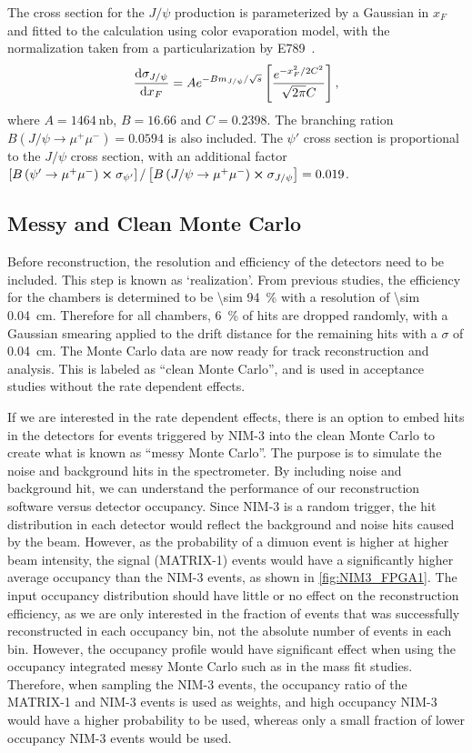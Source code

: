 \documentclass[../main.tex]{subfiles}
\begin{document}
The cross section for the $J/\psi$ production is parameterized by a Gaussian in $x_F$ and fitted to the
calculation using color evaporation model, with the normalization taken from a particularization by E789~\cite{schub1995}.
\begin{equation}
	\dv{\sigma_{J/\psi}}{x_F} = Ae^{-Bm_{J/\psi}/\sqrt{s}} \left[ \frac{e^{-x^2_F/2C^2}}{\sqrt{2\pi}C} \right],
\end{equation}
where $A=\SI{1464}{\nano\barn}$, $B=16.66$ and $C=0.2398$.
The branching ration $B\left(J/\psi\rightarrow \mu^+ \mu^-\right)=0.0594$ is also included.
The $\psi'$ cross section is proportional to the $J/\psi$ cross section, with an additional factor
$\left[B\left(\psi'\rightarrow \mu^+ \mu^-\right)\cross\sigma_{\psi'}\right]/\left[B\left(J/\psi\rightarrow \mu^+ \mu^-\right)\cross\sigma_{J/\psi}\right]=0.019$.

\subsection{Messy and Clean Monte Carlo}
\label{subsec:messyMC}
Before reconstruction, the resolution and efficiency of the detectors need to be included.
This step is known as `realization'.
From previous studies, the efficiency for the chambers is determined to be \SI{\sim 94}{\percent}
with a resolution of \SI{\sim 0.04}{\cm}. Therefore for all chambers, \SI{6}{\percent} of
hits are dropped randomly, with a Gaussian smearing applied to the drift distance for the remaining
hits with a $\sigma$ of \SI{0.04}{\cm}. The Monte Carlo data are now ready for track reconstruction and analysis.
This is labeled as ``clean Monte Carlo'', and is used in acceptance studies without the
rate dependent effects.

If we are interested in the rate dependent effects, there is an option to embed
hits in the detectors for events triggered by NIM-3 into
the clean Monte Carlo to create what is known as ``messy Monte Carlo''.
The purpose is to simulate the noise and background hits in the spectrometer. By including noise
and background hit, we can understand the performance of our reconstruction software versus detector
occupancy.
Since NIM-3 is a random trigger, the hit distribution in each detector would reflect
the background and noise hits caused by the beam. However, as the probability of a dimuon event
is higher at higher beam intensity, the signal (MATRIX-1) events would have a significantly higher
average occupancy than the NIM-3 events, as shown in \cref{fig:NIM3_FPGA1}.
The input occupancy distribution should have little or no
effect on the reconstruction efficiency, as we are only interested in the fraction of events that was
successfully reconstructed in each occupancy bin, not the absolute number of events in each bin.
However, the occupancy profile would have significant effect when using the occupancy integrated
messy Monte Carlo such as in the mass fit studies. Therefore, when sampling the NIM-3 events, the occupancy ratio
of the MATRIX-1 and NIM-3 events is used as weights, and high occupancy NIM-3 would have a higher
probability to be used, whereas only a small fraction of lower occupancy NIM-3 events would be used.
\end{document}
